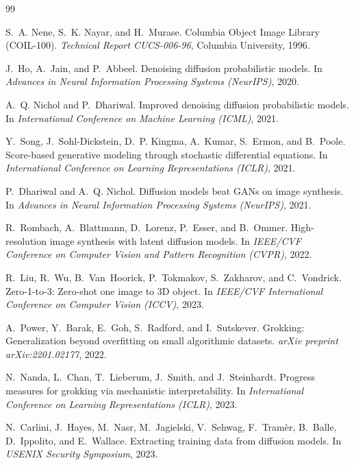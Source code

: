 \documentclass[11pt]{article}
\begin{document}

\begin{thebibliography}{99}

S.~A. Nene, S.~K. Nayar, and H.~Murase.
Columbia Object Image Library (COIL-100).
\textit{Technical Report CUCS-006-96}, Columbia University, 1996.

J.~Ho, A.~Jain, and P.~Abbeel.
Denoising diffusion probabilistic models.
In \textit{Advances in Neural Information Processing Systems (NeurIPS)}, 2020.

A.~Q. Nichol and P.~Dhariwal.
Improved denoising diffusion probabilistic models.
In \textit{International Conference on Machine Learning (ICML)}, 2021.

Y.~Song, J.~Sohl-Dickstein, D.~P. Kingma, A.~Kumar, S.~Ermon, and B.~Poole.
Score-based generative modeling through stochastic differential equations.
In \textit{International Conference on Learning Representations (ICLR)}, 2021.

P.~Dhariwal and A.~Q. Nichol.
Diffusion models beat GANs on image synthesis.
In \textit{Advances in Neural Information Processing Systems (NeurIPS)}, 2021.

R.~Rombach, A.~Blattmann, D.~Lorenz, P.~Esser, and B.~Ommer.
High-resolution image synthesis with latent diffusion models.
In \textit{IEEE/CVF Conference on Computer Vision and Pattern Recognition (CVPR)}, 2022.

R.~Liu, R.~Wu, B.~Van~Hoorick, P.~Tokmakov, S.~Zakharov, and C.~Vondrick.
Zero-1-to-3: Zero-shot one image to 3D object.
In \textit{IEEE/CVF International Conference on Computer Vision (ICCV)}, 2023.

A.~Power, Y.~Barak, E.~Goh, S.~Radford, and I.~Sutskever.
Grokking: Generalization beyond overfitting on small algorithmic datasets.
\textit{arXiv preprint arXiv:2201.02177}, 2022.

N.~Nanda, L.~Chan, T.~Lieberum, J.~Smith, and J.~Steinhardt.
Progress measures for grokking via mechanistic interpretability.
In \textit{International Conference on Learning Representations (ICLR)}, 2023.

N.~Carlini, J.~Hayes, M.~Nasr, M.~Jagielski, V.~Sehwag, F.~Tram\`er,
B.~Balle, D.~Ippolito, and E.~Wallace.
Extracting training data from diffusion models.
In \textit{USENIX Security Symposium}, 2023.


\end{thebibliography}
\end{document}
